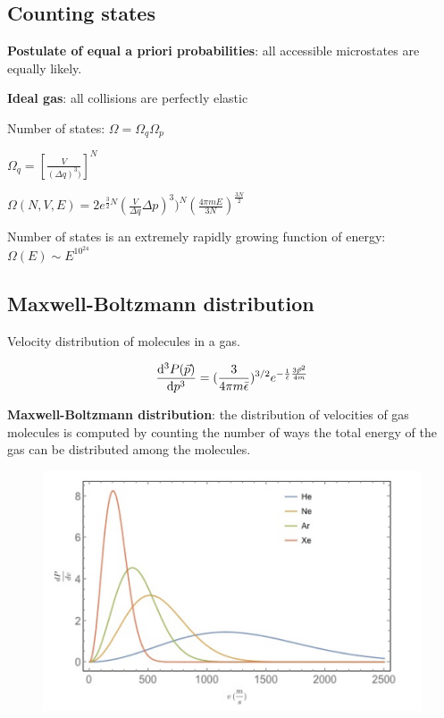 \subsection{Counting states}

\textbf{Postulate of equal a priori probabilities}: all accessible microstates are equally likely.

\textbf{Ideal gas}: all collisions are perfectly elastic

Number of states: $\Omega = \Omega_q \Omega_p$

$\Omega_q = [\frac{V}{(\Delta q)^3)}]^N$

$\Omega(N, V, E) = 2 e^{\frac{3}{2} N} (\frac{V}{\Delta q}{\Delta} p)^3)^N (\frac{4 \pi m E}{3N})^{\frac{3N}{2}}$

Number of states is an extremely rapidly growing function of energy: $\Omega(E) \sim E^{10^{24}}$

\subsection{Maxwell-Boltzmann distribution}

Velocity distribution of molecules in a gas.

$$\dv[3]{P(\vec{p})}{p} = (\frac{3}{4 \pi m \bar{\epsilon}})^{3/2} e^{-\frac{1}{\bar{\epsilon}} \frac{3 \vec{p}^2}{4 m}}$$

\textbf{Maxwell-Boltzmann distribution}: the distribution of velocities of gas molecules is computed by counting the number of ways the total energy of the gas can be distributed among the molecules.

\begin{figure}[h]
    \centering
    \includegraphics[width=0.8\linewidth]{figures/03_07.png}
\end{figure}